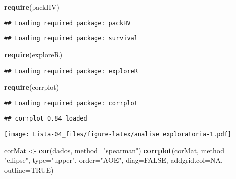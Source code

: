 \documentclass[
]{article}
\newenvironment{Shaded}{\begin{snugshade}}{\end{snugshade}}
\newcommand{\DataTypeTok}[1]{\textcolor[rgb]{0.13,0.29,0.53}{#1}}
\newcommand{\KeywordTok}[1]{\textcolor[rgb]{0.13,0.29,0.53}{\textbf{#1}}}
\newcommand{\NormalTok}[1]{#1}
\newcommand{\OperatorTok}[1]{\textcolor[rgb]{0.81,0.36,0.00}{\textbf{#1}}}
\newcommand{\OtherTok}[1]{\textcolor[rgb]{0.56,0.35,0.01}{#1}}
\newcommand{\StringTok}[1]{\textcolor[rgb]{0.31,0.60,0.02}{#1}}
\begin{document}
\begin{Shaded}
\begin{Highlighting}[]
\KeywordTok{require}\NormalTok{(packHV)}
\end{Highlighting}
\end{Shaded}

\begin{verbatim}
## Loading required package: packHV
\end{verbatim}

\begin{verbatim}
## Loading required package: survival
\end{verbatim}

\begin{Shaded}
\begin{Highlighting}[]
\KeywordTok{require}\NormalTok{(exploreR)}
\end{Highlighting}
\end{Shaded}

\begin{verbatim}
## Loading required package: exploreR
\end{verbatim}

\begin{Shaded}
\begin{Highlighting}[]
\KeywordTok{require}\NormalTok{(corrplot)}
\end{Highlighting}
\end{Shaded}

\begin{verbatim}
## Loading required package: corrplot
\end{verbatim}

\begin{verbatim}
## corrplot 0.84 loaded
\end{verbatim}

\begin{Shaded}
\end{Shaded}

\texttt{[image: Lista-04\_files/figure-latex/analise exploratoria-1.pdf]}

\begin{Shaded}
\begin{Highlighting}[]
\NormalTok{corMat <-}\StringTok{ }\KeywordTok{cor}\NormalTok{(dados, }\DataTypeTok{method=}\StringTok{"spearman"}\NormalTok{)}
\KeywordTok{corrplot}\NormalTok{(corMat, }\DataTypeTok{method =} \StringTok{"ellipse"}\NormalTok{, }\DataTypeTok{type=}\StringTok{"upper"}\NormalTok{, }\DataTypeTok{order=}\StringTok{"AOE"}\NormalTok{, }
          \DataTypeTok{diag=}\OtherTok{FALSE}\NormalTok{, }\DataTypeTok{addgrid.col=}\OtherTok{NA}\NormalTok{, }\DataTypeTok{outline=}\OtherTok{TRUE}\NormalTok{)}
\end{Highlighting}
\end{Shaded}
\end{document}
